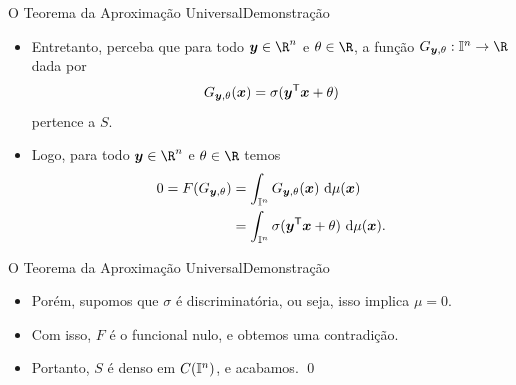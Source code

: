 \documentclass[13pt]{beamer}
\begin{document}
\begin{frame}{O Teorema da Aproximação Universal}{Demonstração}
    \begin{itemize}
        \item<1-> Entretanto, perceba que para todo \( \bfy \in \R^{ n } \) e \( \theta \in \R \), a função \( G_{ \bfy, \theta } : \I^{ n } \to \R \) dada por
            \begin{equation*}
                G_{ \bm{y}, \theta } ( \bm{x} ) = \sigma ( \bm{y}^{ \mathsf{T} } \bm{x} + \theta )
            \end{equation*}
            pertence a \( S \).
        \item<2-> Logo, para todo \( \bfy \in \R^{ n } \) e \( \theta \in \R \) temos
            \begin{align*}
                0 = F ( G_{ \bm{y}, \theta } ) &= \int_{ \mathbb{I}^{ n } } G_{ \bm{y}, \theta } ( \bm{x} ) \ \mathrm{d} \mu ( \bm{x} ) \\
                                             &= \int_{ \mathbb{I}^{ n } } \sigma ( \bm{y}^{ \mathsf{T} } \bm{x} + \theta ) \ \mathrm{d} \mu ( \bm{x} )
            .\end{align*}
    \end{itemize}
\end{frame}

\begin{frame}{O Teorema da Aproximação Universal}{Demonstração}
    \begin{itemize}
        \item<1-> Porém, supomos que \( \sigma \) é discriminatória, ou seja, isso implica \( \mu = 0 \).
        \item<2-> Com isso, \( F \) é o funcional nulo, e obtemos uma contradição.
        \item<3-> Portanto, \( S \) é denso em \( C (  \mathbb{I}^{ n } ) \), e acabamos. \hfill \qed
    \end{itemize}
\end{frame}
\end{document}
